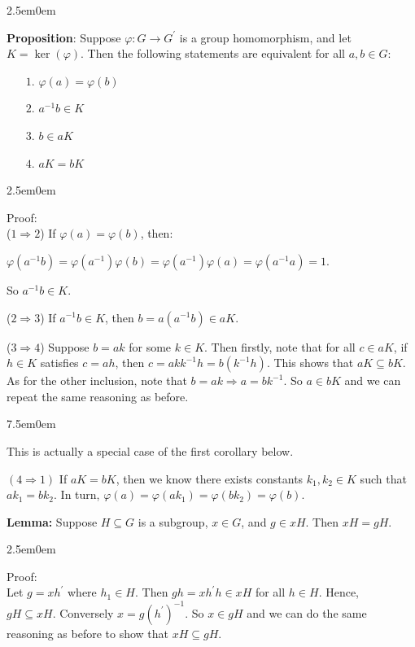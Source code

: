 \documentclass{book}
\newcommand{\hTwo}{%
\color{MidnightBlue}%
   \fontsize{13}{15}\selectfont%
}
\newcommand{\hThree}{%
   \color{PineGreen!85!Orange}
   \fontsize{12}{14}\selectfont%
}
\newcommand{\teachComment}{
   \color{Orange}%
   \fontsize{12}{14}\selectfont%
}
\newenvironment{myIndent}{%
   \begin{adjustwidth}{2.5em}{0em}%
}{%
   \end{adjustwidth}%
}
\newenvironment{myTindent}{%
   \begin{adjustwidth}{7.5em}{0em}%
}{%
   \end{adjustwidth}%
}
\newcommand{\blab}[1]{\textbf{#1}}
\newcommand{\retTwo}{\hfill\bigbreak}
\begin{document}
\begin{myIndent}\hTwo
	\blab{Proposition}: Suppose $\varphi: G \longrightarrow G^\prime$ is a group homomorphism, and let\\ $K = \ker(\varphi)$. Then the following statements are equivalent for all $a, b \in G$:
	\begin{itemize}
		\item[$1$.] $\varphi(a) = \varphi(b)$
		\item[$2$.] $a^{-1}b \in K$
		\item[$3$.] $b \in aK$
		\item[$4$.] $aK = bK$
	\end{itemize}

	\begin{myIndent}\hThree
		Proof:\\
		($1 \Longrightarrow 2$) If $\varphi(a) = \varphi(b)$, then:

		{\centering $\varphi(a^{-1}b) = \varphi(a^{-1})\varphi(b) = \varphi(a^{-1})\varphi(a) = \varphi(a^{-1}a) = 1$.\retTwo\par}
		
		So $a^{-1}b \in K$.\retTwo

		($2 \Longrightarrow 3$) If $a^{-1}b \in K$, then $b = a(a^{-1}b) \in aK$.\retTwo

		($3 \Longrightarrow 4$) Suppose $b = ak$ for some $k \in K$. Then firstly, note that for all $c \in aK$, if $h \in K$ satisfies $c = ah$, then $c = akk^{-1}h = b(k^{-1}h)$. This shows that $aK \subseteq bK$. As for the other inclusion, note that $b = ak \Longrightarrow a = bk^{-1}$. So $a \in bK$ and we can repeat the same reasoning as before.
		
		\begin{myTindent}\teachComment
			This is actually a special case of the first corollary below.\retTwo
		\end{myTindent}

		$(4 \Longrightarrow 1)$ If $aK = bK$, then we know there exists constants $k_1, k_2 \in K$ such that $ak_1 = bk_2$. In turn, $\varphi(a) = \varphi(ak_1) = \varphi(bk_2) = \varphi(b)$.\retTwo
	\end{myIndent}

	\blab{Lemma:} Suppose $H \subseteq G$ is a subgroup, $x \in G$, and $g \in xH$. Then $xH = gH$.

	\begin{myIndent}\hThree
		Proof:\\
		Let $g = xh^\prime$ where $h_1 \in H$. Then $gh = xh^\prime h \in xH$ for all $h \in H$. Hence,\\ $gH \subseteq xH$. Conversely $x = g(h^\prime)^{-1}$. So $x \in gH$ and we can do the same\\ reasoning as before to show that $xH \subseteq gH$.\retTwo
	\end{myIndent}


\end{myIndent}
\end{document}
